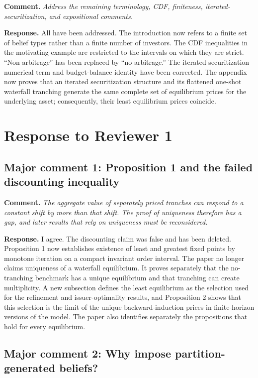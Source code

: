 \documentclass[11pt]{article}
\newcommand{\commenttext}[1]{\par\noindent\textbf{Comment.} \textit{#1}\par}
\newcommand{\response}[1]{\par\noindent\textbf{Response.} #1\par}
\begin{document}
\commenttext{Address the remaining terminology, CDF, finiteness, iterated-securitization, and expositional comments.}

\response{All have been addressed. The introduction now refers to a finite set of belief types rather than a finite number of investors. The CDF inequalities in the motivating example are restricted to the intervals on which they are strict. ``Non-arbitrage'' has been replaced by ``no-arbitrage.'' The iterated-securitization numerical term and budget-balance identity have been corrected. The appendix now proves that an iterated securitization structure and its flattened one-shot waterfall tranching generate the same complete set of equilibrium prices for the underlying asset; consequently, their least equilibrium prices coincide.}

\section*{Response to Reviewer 1}

\subsection*{Major comment 1: Proposition 1 and the failed discounting inequality}

\commenttext{The aggregate value of separately priced tranches can respond to a constant shift by more than that shift. The proof of uniqueness therefore has a gap, and later results that rely on uniqueness must be reconsidered.}

\response{I agree. The discounting claim was false and has been deleted. Proposition 1 now establishes existence of least and greatest fixed points by monotone iteration on a compact invariant order interval. The paper no longer claims uniqueness of a waterfall equilibrium. It proves separately that the no-tranching benchmark has a unique equilibrium and that tranching can create multiplicity. A new subsection defines the least equilibrium as the selection used for the refinement and issuer-optimality results, and Proposition 2 shows that this selection is the limit of the unique backward-induction prices in finite-horizon versions of the model. The paper also identifies separately the propositions that hold for every equilibrium.}

\subsection*{Major comment 2: Why impose partition-generated beliefs?}
\end{document}
